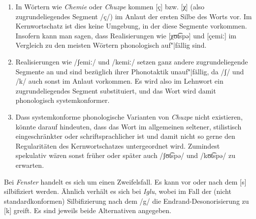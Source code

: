 \begin{enumerate}
  \item In Wörtern wie \textit{Chemie} oder \textit{Chuzpe} kommen [ç] bzw. [χ] (also zugrundeliegendes Segment /ç/) im Anlaut der ersten Silbe des Worts vor.
    Im Kernwortschatz ist dies keine Umgebung, in der diese Segmente vorkommen.
    Insofern kann man sagen, dass Realisierungen wie [χʊt͡spə] und [çemiː] im Vergleich zu den meisten Wörtern phonologisch auf"|fällig sind.
  \item Realisierungen wie /ʃemiː/ und /kemiː/ setzen ganz andere zugrundeliegende Segmente an und sind bezüglich ihrer Phonotaktik unauf"|fällig, da /ʃ/ und /k/ auch sonst im Anlaut vorkommen.
    Es wird also im Lehnwort ein zugrundeliegendes Segment substituiert, und das Wort wird damit phonologisch systemkonformer.
  \item Dass systemkonforme phonologische Varianten von \textit{Chuzpe} nicht existieren, könnte darauf hindeuten, dass das Wort im allgemeinen seltener, stilistisch eingeschränkter oder schriftsprachlicher ist und damit nicht so gerne den Regularitäten des Kernwortschatzes untergeordnet wird.
    Zumindest spekulativ wären sonst früher oder später auch /ʃʊt͡spə/ und /kʊt͡spə/ zu erwarten.
\end{enumerate}

\label{sol:phonologie04}

Bei \textit{Fenster} handelt es sich um einen Zweifelsfall.
Es kann vor oder nach dem [s] silbifiziert werden.
Ähnlich verhält es sich bei \textit{Iglu}, wobei im Fall der (nicht standardkonformen) Silbifizierung nach dem /g/ die Endrand-Desonorisierung zu [k] greift. 
Es sind jeweils beide Alternativen angegeben.

